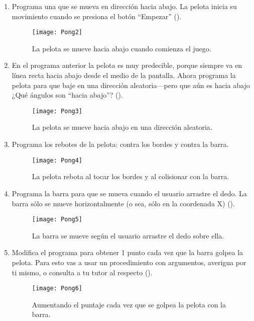 \begin{enumerate}

\item Programa una  que se mueva en dirección hacia
  abajo. La pelota inicia su movimiento cuando se presiona el botón
  ``Empezar'' ().

\begin{figure}[H]
\centering
\texttt{[image: Pong2]}
\caption{La pelota se mueve hacia abajo cuando comienza el juego.}
\label{fig:Pong2}
\end{figure}

\item En el programa anterior la pelota es muy predecible, porque
  siempre va en línea recta hacia abajo desde el medio de la
  pantalla. Ahora programa la pelota para que baje en una dirección
  aleatoria---pero que aún es hacia abajo ¿Qué ángulos son ``hacia
  abajo''? ().

\begin{figure}[H]
\centering
\texttt{[image: Pong3]}
\caption{La pelota se mueve hacia abajo en una dirección aleatoria.}
\label{fig:Pong3}
\end{figure}

\item Programa los rebotes de la pelota: contra los bordes y contra la
  barra.

\begin{figure}[H]
\centering
\texttt{[image: Pong4]}
\caption{La pelota rebota al tocar los bordes y al colisionar con la barra.}
\label{fig:Pong4}
\end{figure}

\item Programa la barra para que se mueva cuando el usuario arrastre
  el dedo. La barra sólo se mueve horizontalmente (o sea, sólo en la
  coordenada X) ().

\begin{figure}[H]
\centering
\texttt{[image: Pong5]}
\caption{La barra se mueve según el usuario arrastre el dedo sobre ella.}
\label{fig:Pong5}
\end{figure}

\item Modifica el programa para obtener 1 punto cada vez que la barra
  golpea la pelota. Para esto vas a usar un procedimiento con
  argumentos, averigua por ti mismo, o consulta a tu tutor al
  respecto ().

\begin{figure}[H]
\centering
\texttt{[image: Pong6]}
\caption{Aumentando el puntaje cada vez que se golpea la pelota con la
barra.}
\label{fig:Pong6}
\end{figure}


\end{enumerate}
